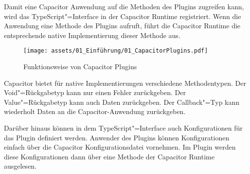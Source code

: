 Damit eine Capacitor Anwendung auf die Methoden des Plugins zugreifen kann, wird das TypeScript"=Interface in der Capacitor Runtime registriert.
Wenn die Anwendung eine Methode des Plugins aufruft, führt die Capacitor Runtime die entsprechende native Implementierung dieser Methode aus.

\begin{figure}[H]
    \centering
    \texttt{[image: assets/01\_Einführung/01\_CapacitorPlugins.pdf]}
    \caption{Funktionsweise von Capacitor Plugins}
\end{figure}

\vspace{-1em}

Capacitor bietet für native Implementierungen verschiedene Methodentypen.
Der Void"=Rückgabetyp kann nur einen Fehler zurückgeben.
Der Value"=Rückgabetyp kann auch Daten zurückgeben.
Der Callback"=Typ kann wiederholt Daten an die Capacitor-Anwendung zurückgeben.
\cite{capacitor:docs}

Darüber hinaus können in dem TypeScript"=Interface auch Konfigurationen für das Plugin definiert werden.
Anwender des Plugins können Konfigurationen einfach über die Capacitor Konfigurationsdatei vornehmen.
Im Plugin werden diese Konfigurationen dann über eine Methode der Capacitor Runtime ausgelesen.
\cite{capacitor:docs}
